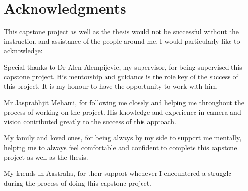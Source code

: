 \newpage
\section*{Acknowledgments}

\renewcommand{\baselinestretch}{\linespacing}
\small\normalsize
This capstone project as well as the thesis would not be successful without the instruction and assistance of the people around me. I would particularly like to acknowledge:

\vspace{10mm}
Special thanks to Dr Alen Alempijevic, my supervisor, for being supervised this capstone project. His mentorship and guidance is the role key of the success of this project. It is my honour to have the opportunity to work with him.

\vspace{10mm}
Mr Jasprabhjit Mehami, for following me closely and helping me throughout the process of working on the project. His knowledge and experience in camera and vision contributed greatly to the success of this approach.

\vspace{10mm}
My family and loved ones, for being always by my side to support me mentally, helping me to always feel comfortable and confident to complete this capstone project as well as the thesis.

\vspace{10mm}
My friends in Australia, for their support whenever I encountered a struggle during the process of doing this capstone project.

